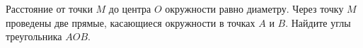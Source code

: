 \begin{ex}
	\begin{condition}
		Расстояние от точки \( M \) до центра \( O \) окружности равно диаметру. Через точку \( M \) проведены две прямые, касающиеся окружности в точках \( A \) и \( B \). Найдите углы треугольника \( AOB \).
	\end{condition}
\end{ex}